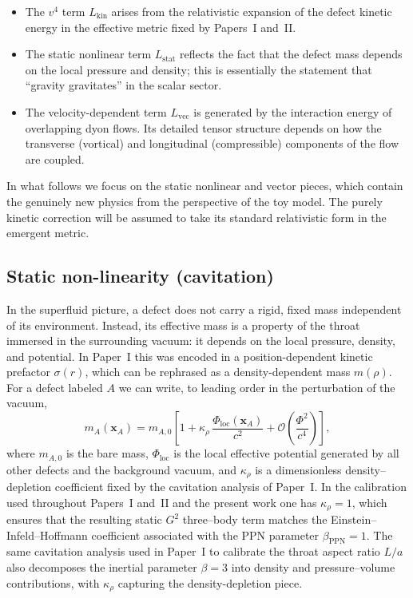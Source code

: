 \documentclass[11pt]{article}
\begin{document}
\begin{itemize}
  \item The $v^4$ term $L_{\text{kin}}$ arises from the relativistic
        expansion of the defect kinetic energy in the effective
        metric fixed by Papers~I and~II.
  \item The static nonlinear term $L_{\text{stat}}$ reflects the
        fact that the defect mass depends on the local pressure and
        density; this is essentially the statement that ``gravity
        gravitates'' in the scalar sector.
  \item The velocity-dependent term $L_{\text{vec}}$ is generated by
        the interaction energy of overlapping dyon flows.
        Its detailed tensor structure depends on how the transverse
        (vortical) and longitudinal (compressible) components of
        the flow are coupled.
\end{itemize}

In what follows we focus on the static nonlinear and vector pieces,
which contain the genuinely new physics from the perspective of the
toy model.  The purely kinetic correction will be assumed to take its
standard relativistic form in the emergent metric.

\subsection{Static non-linearity (cavitation)}
\label{subsec:nbody-static}

In the superfluid picture, a defect does not carry a rigid, fixed
mass independent of its environment.
Instead, its effective mass is a property of the throat immersed in
the surrounding vacuum: it depends on the local pressure, density,
and potential.
In Paper~I this was encoded in a position-dependent kinetic
prefactor $\sigma(r)$, which can be rephrased as a density-dependent
mass $m(\rho)$.
For a defect labeled $A$ we can write, to leading order in the
perturbation of the vacuum,
\begin{equation}
  m_A(\mathbf{x}_A)
  = m_{A,0}\left[
      1 + \kappa_\rho\,
          \frac{\Phi_{\text{loc}}(\mathbf{x}_A)}{c^2}
      + \mathcal{O}\!\left(\frac{\Phi^2}{c^4}\right)
    \right],
  \label{eq:mass-density-dep}
\end{equation}
where $m_{A,0}$ is the bare mass, $\Phi_{\text{loc}}$ is the local
effective potential generated by all other defects and the background
vacuum, and $\kappa_\rho$ is a dimensionless density–depletion
coefficient fixed by the cavitation analysis of Paper~I.
In the calibration used throughout Papers~I and~II and the present work one has
$\kappa_\rho = 1$, which ensures that the resulting static $G^2$
three–body term matches the Einstein--Infeld--Hoffmann coefficient
associated with the PPN parameter $\beta_{\mathrm{PPN}}=1$.
The same cavitation analysis used in Paper~I to calibrate the throat
aspect ratio $L/a$ also decomposes the inertial parameter $\beta=3$
into density and pressure--volume contributions, with $\kappa_\rho$
capturing the density-depletion piece.
\end{document}
